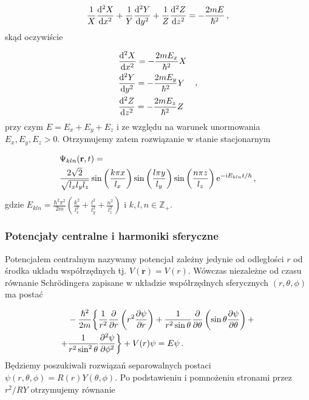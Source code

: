 \documentclass{myclass}
\begin{document}
\begin{equation*}
\frac{1}{X}\dv[2]{X}{x}+\frac{1}{Y}\dv[2]{Y}{y}+\frac{1}{Z}\dv[2]{Z}{z}=-\frac{2mE}{\hbar^2}\,,
\end{equation*}
skąd oczywiście

\begin{equation*}
\begin{split}
&\dv[2]{X}{x}=-\frac{2mE_x}{\hbar^2}X\\
&\dv[2]{Y}{y}=-\frac{2mE_y}{\hbar^2}Y\\
&\dv[2]{Z}{z}=-\frac{2mE_z}{\hbar^2}Z
\end{split}\quad,
\end{equation*}
przy czym \(E=E_x+E_y+E_z\) i ze względu na warunek unormowania \(E_x,E_y,E_z>0\). Otrzymujemy zatem
rozwiązanie w stanie stacjonarnym

\begin{equation*}
\begin{split}
&\Psi_{kln}(\mathbf{r},t)=\\
&\frac{2\sqrt{2}}{\sqrt{l_xl_yl_z}}\sin\left(\frac{k\pi x}{l_x}\right)\sin\left(\frac{l\pi y}{l_y}\right)\sin\left(\frac{n\pi z}{l_z}\right)\mathrm{e}^{-\mathrm{i} E_{kln}t/\hbar}\,,
\end{split}
\end{equation*}
gdzie
\(E_{kln}=\frac{\hbar^2\pi^2}{2m}\left(\frac{k^2}{l_x^2}+\frac{l^2}{l_y^2}+\frac{n^2}{l_z^2}\right)\)
i \(k,l,n\in\mathbb{Z}_+\).

\subsubsection{Potencjały centralne i harmoniki sferyczne}

Potencjałem centralnym nazywamy potencjał zależny jedynie od odległości \(r\) od środka układu
współrzędnych tj. \(V(\mathbf{r})=V(r)\). Wówczas niezależne od czasu równanie Schr{\"o}dingera
zapisane w układzie współrzędnych sferycznych \((r,\theta,\phi)\) ma postać

\begin{equation*}
\begin{split}
    &-\frac{\hbar^2}{2m}\bigg\{\frac{1}{r^2}\pdv{ }{r}\left(r^2\pdv{\psi}{r}\right)+\frac{1}{r^2\sin\theta}\pdv{ }{\theta}\left(\sin\theta\pdv{\psi}{\theta}\right)+\\
    +&\frac{1}{r^2\sin^2\theta}\pdv[2]{\psi}{\phi}\bigg\}+V(r)\psi=E\psi\,.
\end{split}
\end{equation*}
Będziemy poszukiwali rozwiązań separowalnych postaci \(\psi(r,\theta,\phi)=R(r)Y(\theta,\phi)\). Po
podstawieniu i pomnożeniu stronami przez \(r^2/RY\) otrzymujemy równanie
\end{document}
